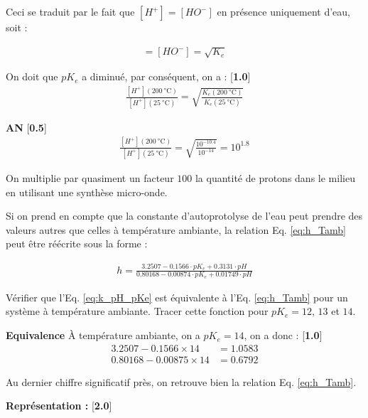 \documentclass[twoside,a4paper,11pt,addpoints]{exam}%
\begin{document}
\begin{questions}
\begin{mybox}
\begin{solution}[5cm]
Ceci se traduit par le fait que $[H^+] = [HO^-]$ en présence uniquement d'eau, soit : 

\begin{align*}
[H^+] = [HO^-] = \sqrt{K_e}
\end{align*}

On doit que $pK_e$ a diminué, par conséquent, on a : [\textbf{1.0}]
\begin{align*}
\frac{[H^+](200 ~ \si{\celsius})}{[H^+](25 ~ \si{\celsius})} = \sqrt{\frac{K_e (200 ~ \si{\celsius})}{K_e( 25 ~ \si{\celsius} )}}
\end{align*}

\textbf{AN} [\textbf{0.5}]
\begin{align*}
\frac{[H^+](200 ~ \si{\celsius})}{[H^+](25 ~ \si{\celsius})} = \sqrt{\frac{10^{-10.4}}{10^{-14}}} = 10^{1.8}
\end{align*}


On multiplie par quasiment un facteur $100$ la quantité de protons dans le milieu en utilisant une synthèse micro-onde.

\end{solution}
\end{mybox}

Si on prend en compte que la constante d'autoprotolyse de l'eau peut prendre des valeurs autres que celles à température ambiante, la relation Eq. \ref{eq:h_Tamb} peut être réécrite sous la forme : 

\begin{align}
h = \frac{3.2507 - 0.1566 \cdot pK_e +  0.3131 \cdot pH}{0.80168 - 0.00874 \cdot pK_e +  0.01749 \cdot pH}
\label{eq:k_pH_pKe}
\end{align}

\question[3] Vérifier que l'Eq. \ref{eq:k_pH_pKe} est équivalente à l'Eq. \ref{eq:h_Tamb} pour un système à température ambiante. Tracer cette fonction pour $pK_e = 12$, $13$ et $14$.

\begin{mybox}
\begin{solution}[5cm]
\textbf{Equivalence} \`{A} température ambiante, on a $pK_e = 14$, on a donc : [\textbf{1.0}]
\begin{align*}
3.2507 - 0.1566 \times 14 &= 1.0583 \\
0.80168 - 0.00875 \times 14 &= 0.6792
\end{align*}

Au dernier chiffre significatif près, on retrouve bien la relation Eq. \ref{eq:h_Tamb}.

\textbf{Représentation :} [\textbf{2.0}]


\end{solution}
\end{mybox}
\end{questions}
\end{document}
